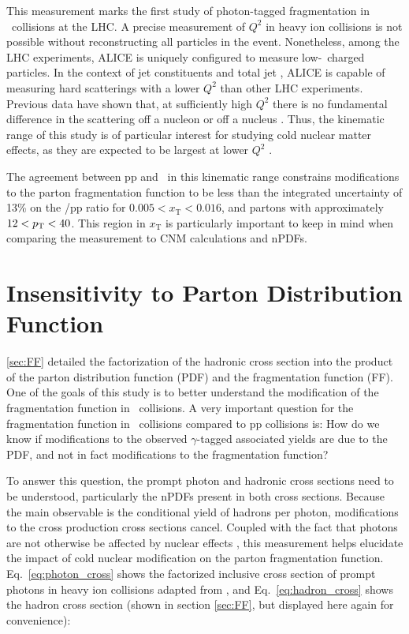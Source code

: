 This measurement marks the first study of photon-tagged fragmentation in \pPb~collisions at the LHC. A precise measurement of $Q^2$ in heavy ion collisions is not possible without reconstructing all particles in the event. Nonetheless, among the LHC experiments, ALICE is uniquely configured to measure low-\pt~charged particles. In the context of jet constituents and total jet \pt, ALICE is capable of measuring hard scatterings with a lower $Q^{2}$ than other LHC experiments. Previous data have shown that, at sufficiently high $Q^2$ there is no fundamental difference in the scattering off a nucleon or off a nucleus \cite{epps16:2017,ALTARELLI1977298}. Thus, the kinematic range of this study is of particular interest for studying cold nuclear matter effects, as they are expected to be largest at lower $Q^{2}$ \cite{epps16:2017}. 

The agreement between pp and \pPb~in this kinematic range constrains modifications to the parton fragmentation function to be less than the integrated uncertainty of 13\% on the \pPb/pp ratio for $ 0.005 < x_{\mathrm{T}} < 0.016$, and partons with approximately $12 < p_{\mathrm{T}} < 40$\GeVc. This region in $x_\mathrm{T}$ is particularly important to keep in mind when comparing the measurement to CNM calculations and nPDFs.

\section{Insensitivity to Parton Distribution Function}
\label{sec:insensitivity}
\ref{sec:FF} detailed the factorization of the hadronic cross section into the product of the parton distribution function (PDF) and the fragmentation function (FF). One of the goals of this study is to better understand the modification of the fragmentation function in \pPb~collisions. A very important question for the fragmentation function in \pPb~collisions compared to pp collisions is: How do we know if modifications to the observed $\gamma$-tagged associated yields are due to the PDF, and not in fact modifications to the fragmentation function?

To answer this question, the prompt photon and hadronic cross sections need to be understood, particularly the nPDFs present in both cross sections. Because the main observable is the conditional yield of hadrons per photon, modifications to the cross production cross sections cancel. Coupled with the fact that photons are not otherwise be affected by nuclear effects \cite{Chatrchyan2012}, this measurement helps elucidate the impact of cold nuclear modification on the parton fragmentation function. Eq.~\ref{eq:photon_cross} shows the factorized inclusive cross section of prompt photons in heavy ion collisions adapted from \cite{Catani2002}, and Eq.~\ref{eq:hadron_cross} shows the hadron cross section (shown in section \ref{sec:FF}, but displayed here again for convenience):


